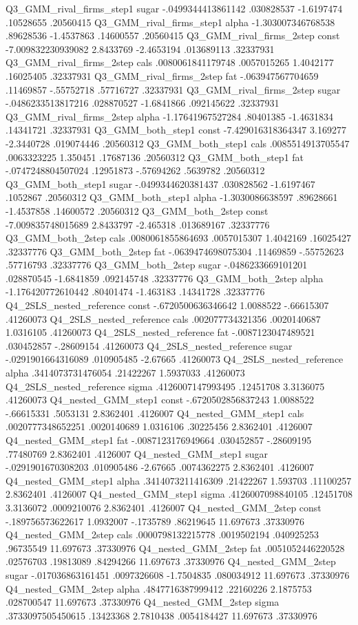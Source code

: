 Q3_GMM_rival_firms_step1	sugar	-.0499344413861142	.030828537	-1.6197474	.10528655	.20560415	
Q3_GMM_rival_firms_step1	alpha	-1.303007346768538	.89628536	-1.4537863	.14600557	.20560415	
Q3_GMM_rival_firms_2step	const	-7.009832230939082	2.8433769	-2.4653194	.013689113	.32337931	
Q3_GMM_rival_firms_2step	cals	.0080061841179748	.0057015265	1.4042177	.16025405	.32337931	
Q3_GMM_rival_firms_2step	fat	-.063947567704659	.11469857	-.55752718	.57716727	.32337931	
Q3_GMM_rival_firms_2step	sugar	-.0486233513817216	.028870527	-1.6841866	.092145622	.32337931	
Q3_GMM_rival_firms_2step	alpha	-1.17641967527284	.80401385	-1.4631834	.14341721	.32337931	
Q3_GMM_both_step1	const	-7.429016318364347	3.169277	-2.3440728	.019074446	.20560312	
Q3_GMM_both_step1	cals	.0085514913705547	.0063323225	1.350451	.17687136	.20560312	
Q3_GMM_both_step1	fat	-.0747248804507024	.12951873	-.57694262	.5639782	.20560312	
Q3_GMM_both_step1	sugar	-.0499344620381437	.030828562	-1.6197467	.1052867	.20560312	
Q3_GMM_both_step1	alpha	-1.3030086638597	.89628661	-1.4537858	.14600572	.20560312	
Q3_GMM_both_2step	const	-7.009835748015689	2.8433797	-2.465318	.013689167	.32337776	
Q3_GMM_both_2step	cals	.0080061855864693	.0057015307	1.4042169	.16025427	.32337776	
Q3_GMM_both_2step	fat	-.0639474698075304	.11469859	-.55752623	.57716793	.32337776	
Q3_GMM_both_2step	sugar	-.0486233669101201	.028870545	-1.6841859	.092145748	.32337776	
Q3_GMM_both_2step	alpha	-1.176420772610442	.80401474	-1.463183	.14341728	.32337776	
Q4_2SLS_nested_reference	const	-.6720500636346642	1.0088522	-.66615307			.41260073
Q4_2SLS_nested_reference	cals	.002077734321356	.0020140687	1.0316105			.41260073
Q4_2SLS_nested_reference	fat	-.0087123047489521	.030452857	-.28609154			.41260073
Q4_2SLS_nested_reference	sugar	-.0291901664316089	.010905485	-2.67665			.41260073
Q4_2SLS_nested_reference	alpha	.3414073731476054	.21422267	1.5937033			.41260073
Q4_2SLS_nested_reference	sigma	.4126007147993495	.12451708	3.3136075			.41260073
Q4_nested_GMM_step1	const	-.6720502856837243	1.0088522	-.66615331	.5053131	2.8362401	.4126007
Q4_nested_GMM_step1	cals	.0020777348652251	.0020140689	1.0316106	.30225456	2.8362401	.4126007
Q4_nested_GMM_step1	fat	-.0087123176949664	.030452857	-.28609195	.77480769	2.8362401	.4126007
Q4_nested_GMM_step1	sugar	-.0291901670308203	.010905486	-2.67665	.0074362275	2.8362401	.4126007
Q4_nested_GMM_step1	alpha	.3414073211416309	.21422267	1.593703	.11100257	2.8362401	.4126007
Q4_nested_GMM_step1	sigma	.4126007098840105	.12451708	3.3136072	.0009210076	2.8362401	.4126007
Q4_nested_GMM_2step	const	-.189756573622617	1.0932007	-.1735789	.86219645	11.697673	.37330976
Q4_nested_GMM_2step	cals	.0000798132215778	.0019502194	.040925253	.96735549	11.697673	.37330976
Q4_nested_GMM_2step	fat	.0051052446220528	.02576703	.19813089	.84294266	11.697673	.37330976
Q4_nested_GMM_2step	sugar	-.017036863161451	.0097326608	-1.7504835	.080034912	11.697673	.37330976
Q4_nested_GMM_2step	alpha	.4847716387999412	.22160226	2.1875753	.028700547	11.697673	.37330976
Q4_nested_GMM_2step	sigma	.3733097505450615	.13423368	2.7810438	.0054184427	11.697673	.37330976
